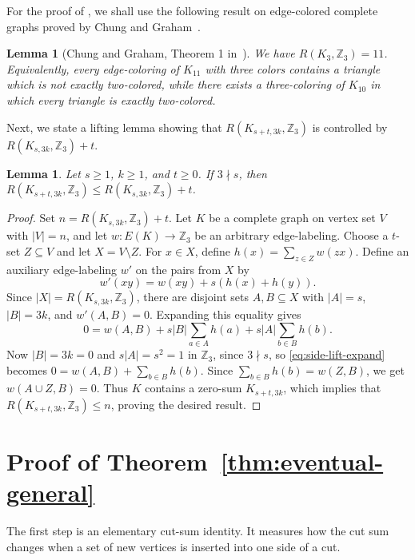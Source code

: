 ﻿\documentclass[11pt]{article}
\numberwithin{equation}{section}
\newtheorem{lemma}[theorem]{Lemma}
\theoremstyle{remark}
\newcommand{\Z}{\mathbb Z}
\begin{document}
For the proof of , we shall use the following result on edge-colored complete graphs proved by Chung and Graham~\cite{ChungGraham1983}.

\begin{lemma}[Chung and Graham, Theorem 1 in~\cite{ChungGraham1983}]\label{lem:cg}
    We have \(R(K_3,\Z_3)=11\). Equivalently, every edge-coloring of \(K_{11}\) with three colors contains a triangle which is not exactly two-colored, while there exists a three-coloring of \(K_{10}\) in which every triangle is exactly two-colored.
\end{lemma}

Next, we state a lifting lemma showing that $R(K_{s+t,3k},\Z_3)$ is controlled by $R(K_{s,3k},\Z_3)+t$.

\begin{lemma}\label{lem:side-lift}
    Let $s\ge1$, $k\ge1$, and $t\ge0$.  If $3\nmid s$, then $R(K_{s+t,3k},\Z_3)\le R(K_{s,3k},\Z_3)+t$.
\end{lemma}
\begin{proof}
    Set $n=R(K_{s,3k},\Z_3)+t$. Let $K$ be a complete graph on vertex set $V$ with $|V|=n$, and let $w\colon E(K)\to\Z_3$ be an arbitrary edge-labeling.  Choose a $t$-set $Z\subseteq V$ and let $X=V\setminus Z$.
    For $x\in X$, define $h(x)=\sum_{z\in Z}w(zx)$.
    Define an auxiliary edge-labeling $w'$ on the pairs from $X$ by
    \[
        w'(xy)=w(xy)+s(h(x)+h(y)).
    \]
    Since $|X|=R(K_{s,3k},\Z_3)$, there are disjoint sets $A,B\subseteq X$ with $|A|=s$, $|B|=3k$, and $w'(A,B)=0$.  Expanding this equality gives
    \begin{equation}\label{eq:side-lift-expand}
        0=w(A,B)+s |B|\sum_{a\in A}h(a)+s |A|\sum_{b\in B}h(b).
    \end{equation}
    Now $|B|=3k=0$ and $s|A|=s^2=1$ in $\Z_3$, since $3\nmid s$, so \eqref{eq:side-lift-expand} becomes $0=w(A,B)+\sum_{b\in B}h(b)$.  Since $\sum_{b\in B}h(b)=w(Z,B)$, we get $w(A\cup Z,B)=0$.  Thus $K$ contains a zero-sum $K_{s+t,3k}$, which implies that $R(K_{s+t,3k},\Z_3)\le n$, proving the desired result.
\end{proof}

\section{Proof of Theorem~\ref{thm:eventual-general}}\label{sec:eventual-proof}

The first step is an elementary cut-sum identity.
It measures how the cut sum changes when a set of new vertices is inserted into one side of a cut.
\end{document}
